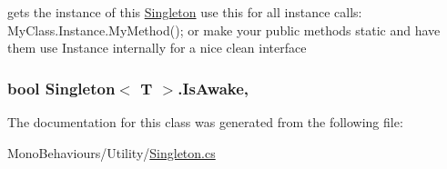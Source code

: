gets the instance of this \hyperlink{class_singleton}{Singleton} use this for all instance calls\+: My\+Class.\+Instance.\+My\+Method(); or make your public methods static and have them use Instance internally for a nice clean interface 

\subsubsection[{\texorpdfstring{Is\+Awake}{IsAwake}}]{\setlength{\rightskip}{0pt plus 5cm}bool {\bf Singleton}$<$ T $>$.Is\+Awake\hspace{0.3cm}{\ttfamily [static]}, {\ttfamily [get]}}\hypertarget{class_singleton_af6b75d5d3b4e230ca3caeb79c686b157}{}\label{class_singleton_af6b75d5d3b4e230ca3caeb79c686b157}


The documentation for this class was generated from the following file\+:\begin{DoxyCompactItemize}
\item 
Mono\+Behaviours/\+Utility/\hyperlink{_singleton_8cs}{Singleton.\+cs}\end{DoxyCompactItemize}
